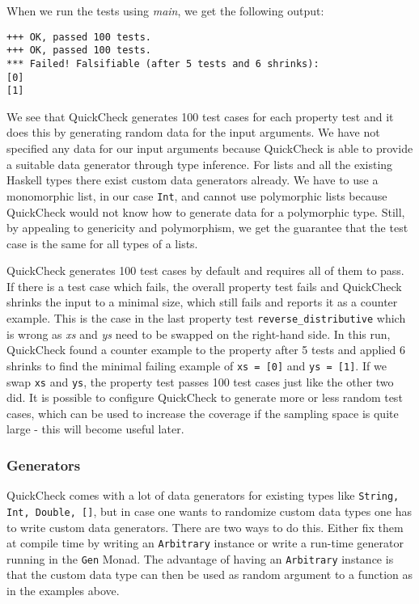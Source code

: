 When we run the tests using \textit{main}, we get the following output:

\begin{verbatim}
+++ OK, passed 100 tests.
+++ OK, passed 100 tests.
*** Failed! Falsifiable (after 5 tests and 6 shrinks):    
[0]
[1]
\end{verbatim}

We see that QuickCheck generates 100 test cases for each property test and it does this by generating random data for the input arguments. We have not specified any data for our input arguments because QuickCheck is able to provide a suitable data generator through type inference. For lists and all the existing Haskell types there exist custom data generators already. We have to use a monomorphic list, in our case \texttt{Int}, and cannot use polymorphic lists because QuickCheck would not know how to generate data for a polymorphic type. Still, by appealing to genericity and polymorphism, we get the guarantee that the test case is the same for all types of a lists.

QuickCheck generates 100 test cases by default and requires all of them to pass. If there is a test case which fails, the overall property test fails and QuickCheck shrinks the input to a minimal size, which still fails and reports it as a counter example. This is the case in the last property test \texttt{reverse\_distributive} which is wrong as \textit{xs} and \textit{ys} need to be swapped on the right-hand side. In this run, QuickCheck found a counter example to the property after 5 tests and applied 6 shrinks to find the minimal failing example of \texttt{xs = [0]} and \texttt{ys = [1]}. If we swap \texttt{xs} and \texttt{ys}, the property test passes 100 test cases just like the other two did. It is possible to configure QuickCheck to generate more or less random test cases, which can be used to increase the coverage if the sampling space is quite large - this will become useful later.

\subsubsection*{Generators}
QuickCheck comes with a lot of data generators for existing types like \texttt{String, Int, Double, []}, but in case one wants to randomize custom data types one has to write custom data generators. There are two ways to do this. Either fix them at compile time by writing an \texttt{Arbitrary} instance or write a run-time generator running in the \texttt{Gen} Monad. The advantage of having an \texttt{Arbitrary} instance is that the custom data type can then be used as random argument to a function as in the examples above.


